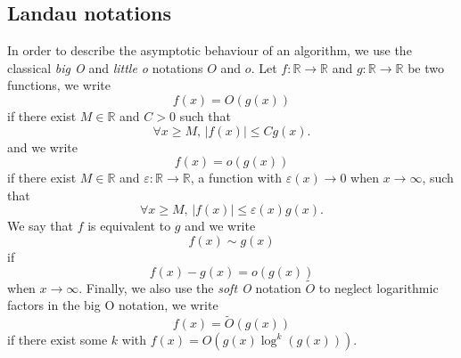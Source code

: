 \subsection{Landau notations}

In order to describe the asymptotic behaviour of an algorithm, we use the
classical \emph{big O} and \emph{little o} notations $O$ and $o$. Let $f:\mathbb{R}\to\mathbb{R}$ and
$g:\mathbb{R}\to\mathbb{R}$ be two functions, we write
\[
  f(x) = O(g(x))
\]
if there exist $M\in\mathbb{R}$ and $C>0$ such that
\[
  \forall x\geq M,\,|f(x)|\leq Cg(x).
\]
and we write
\[
  f(x)=o(g(x))
\]
if there exist $M\in\mathbb{R}$ and $\varepsilon:\mathbb{R}\to\mathbb{R}$, a
function with $\varepsilon(x)\to 0$ when $x\to\infty$, such
that
\[
  \forall x\geq M,\,|f(x)|\leq \varepsilon(x)g(x).
\]
We say that $f$ is equivalent to $g$ and we write
\[
  f(x)\sim g(x)
\]
if 
\[
 f(x)-g(x) = o(g(x))
\]
when $x\to\infty$. Finally, we also use the \emph{soft O} notation $\tilde{O}$ to neglect
logarithmic factors in the big O notation, we write
\[
  f(x) = \tilde{O}(g(x))
\]
if there exist some $k$ with $f(x) = O(g(x)\log^k(g(x)))$.

